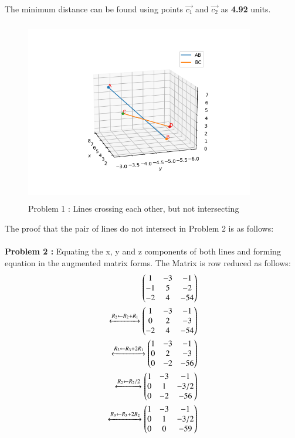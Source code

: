 \documentclass[journal,12pt,twocolumn]{IEEEtran}
\begin{document}
\\
The minimum distance can be found using points $\vec{c_1}$ and $\vec{c_2}$ as \textbf{4.92} units.
\begin{figure}[ht]
\centering
\includegraphics[width=10cm, height=8cm]{Figure_1}
\caption{Problem 1 : Lines crossing each other, but not intersecting}
\label{Fig2}
\end{figure}
\newpage
The proof that the pair of lines do not intersect in Problem 2 is as follows:\\
\\
\textbf{Problem 2 :} Equating the x, y and z components of both lines and forming equation in the augmented matrix forms. The Matrix is row reduced as follows:\\
\begin{align}
\begin{pmatrix}1 & -3 & -1\\-1 & 5 & -2\\-2 &4&-54\end{pmatrix}\\
\xleftrightarrow[]{R_2\leftarrow R_2+R_1}
\begin{pmatrix}1 & -3 & -1 \\0 & 2 & -3\\-2 &4&-54\end{pmatrix}\\
\xleftrightarrow[]{R_3\leftarrow R_3+2R_1}   
\begin{pmatrix}1 & -3 & -1 \\0 & 2 & -3\\0 &-2&-56\end{pmatrix}\\
\xleftrightarrow[]{R_2\leftarrow R_2/2}
\begin{pmatrix}1 & -3 & -1 \\0 & 1 & -3/2\\0 &-2&-56\end{pmatrix}\\
\xleftrightarrow[]{R_3\leftarrow R_3+2R_2}
\begin{pmatrix}1 & -3 & -1 \\0 & 1 & -3/2\\0 &0&-59\end{pmatrix}
\end{align} 
\end{document}
